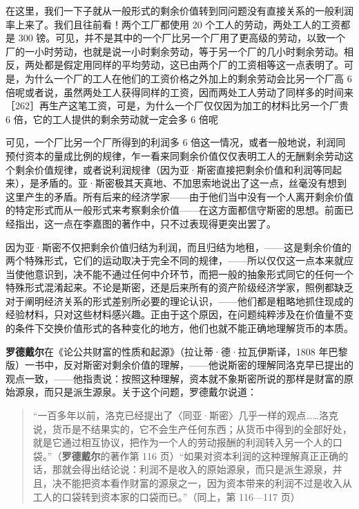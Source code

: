 在这里，我们一下子就从一般形式的剩余价值转到同问题没有直接关系的一般利润率上来了。我们且往前看！两个工厂都使用 20 个工人的劳动，两处工人的工资都是 300 镑。可见，并不是其中的一个厂比另一个厂用了更高级的劳动，以致一个厂的一小时劳动，也就是说一小时剩余劳动，等于另一个厂的几小时剩余劳动。相反，两处都是假定用同样的平均劳动，这已由两个厂的工资相等这一点表明了。可是，为什么一个厂的工人在他们的工资价格之外加上的剩余劳动会比另一个厂高 6 倍呢或者说，虽然两处工人获得同样的工资，因而两处工人劳动了同样多的时间来［262］再生产这笔工资，可是，为什么一个厂仅仅因为加工的材料比另一个厂贵 6 倍，它的工人提供的剩余劳动就一定会多 6 倍呢

可见，一个厂比另一个厂所得到的利润多 6 倍这一情况，或者一般地说，利润同预付资本的量成比例的规律，乍一看来同剩余价值仅仅表明工人的无酬剩余劳动这个剩余价值规律，或者说利润规律（因为亚·斯密直接把剩余价值和利润等同起来），是矛盾的。亚·斯密极其天真地、不加思索地说出了这一点，丝毫没有想到这里产生的矛盾。所有后来的经济学家——由于他们当中没有一个人离开剩余价值的特定形式而从一般形式来考察剩余价值——在这方面都信守斯密的思想。前面已经指出，这一点在李嘉图的著作中，只不过表现得更突出罢了。

因为亚·斯密不仅把剩余价值归结为利润，而且归结为地租，——这是剩余价值的两个特殊形式，它们的运动取决于完全不同的规律，——所以仅仅这一点本来就应当使他意识到，决不能不通过任何中介环节，而把一般的抽象形式同它的任何一个特殊形式混淆起来。不论是斯密，还是后来所有的资产阶级经济学家，照例都缺乏对于阐明经济关系的形式差别所必要的理论认识，——他们都是粗略地抓住现成的经验材料，只对这些材料感兴趣。正由于这个原因，在问题纯粹涉及在价值量不变的条件下交换价值形式的各种变化的地方，他们也就不能正确地理解货币的本质。


\textbf{罗德戴尔}在《论公共财富的性质和起源》（拉让蒂·德·拉瓦伊斯译，1808 年巴黎版）一书中，反对斯密对剩余价值的理解，——他说斯密的理解同洛克早已提出的观点一致，——他指责说：按照这种理解，资本就不象斯密所说的那样是财富的原始源泉，而只是派生源泉。关于这个问题，罗德戴尔说道：

\begin{quote}“一百多年以前，洛克已经提出了〈同亚·斯密〉几乎一样的观点……洛克说，货币是不结果实的，它不会生产任何东西；从货币中得到的全部好处，就是它通过相互协议，把作为一个人的劳动报酬的利润转入另一个人的口袋。”（\textbf{罗德戴尔}的著作第 116 页）“如果对资本利润的这种理解真正正确的话，那就会得出结论说：利润不是收入的原始源泉，而只是派生源泉，并且，决不能把资本看作财富的源泉之一，因为资本带来的利润不过是收入从工人的口袋转到资本家的口袋而已。”（同上，第 116—117 页）\end{quote}

